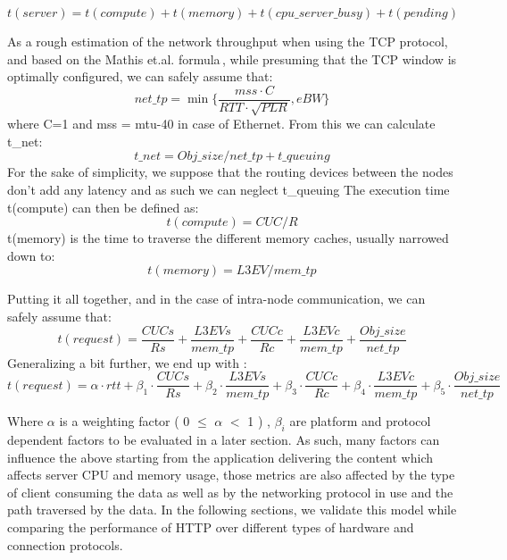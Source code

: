 \documentclass[runningheads]{llncs}
\begin{document}
\begin{equation}
t(server) = t(compute) + t(memory) + t(cpu\_server\_busy) + t(pending)
\end{equation}

As a rough estimation of the network throughput when using the TCP protocol, and based on the Mathis et.al. formula\,\cite{predictability}, while presuming that the TCP window is optimally configured, we can safely assume that:
\begin{equation}
net\_tp= \min\{\frac{mss\cdot C}{RTT \cdot \sqrt{PLR}}, eBW\}
\label{eq:net-tp}
\end{equation}
where C=1 and mss = mtu-40 in case of Ethernet.
From this we can calculate t\_net:
\begin{equation}
 t\_net=Obj\_size / net\_tp + t\_queuing
\end{equation}
For the sake of simplicity, we suppose that the routing devices between the nodes don’t add any latency and as such we can neglect t\_queuing
The execution time t(compute) can then be defined as:
\begin{equation}
t(compute) = CUC /R
\end{equation}
t(memory) is the time to traverse the different memory caches, usually narrowed down to:
\begin{equation}
t(memory)=L3EV/mem\_tp
\end{equation}

Putting it all together, and in the case of intra-node communication, we can safely assume that:
\begin{equation}
t(request)=\frac{CUCs}{Rs}+\frac{L3EVs}{mem\_tp}+\frac{CUCc}{Rc}+\frac{L3EVc}{mem\_tp}+\frac{Obj\_size}{net\_tp}
\end{equation}
Generalizing a bit further, we end up with :
\begin{equation}
\label{eq:model}
t(request)=\alpha\cdot rtt+\beta_1\cdot\frac{CUCs}{Rs}+\beta_2\cdot\frac{L3EVs}{mem\_tp}+\beta_3\cdot\frac{CUCc}{Rc}+\beta_4\cdot\frac{L3EVc}{mem\_tp}+\beta_5\cdot\frac{Obj\_size}{net\_tp}
\end{equation}

Where $\alpha$ is a weighting factor ( 0 $\leq$ $\alpha$ $<$ 1 ) \cite{rfc6298}, $\beta_i$ are platform and protocol dependent factors to be evaluated in a later section.
As such, many factors can influence the above starting from the application delivering the content which affects server CPU and memory usage, those metrics are also affected by the type of client consuming the data as well as by the networking protocol in use and the path traversed by the data. In the following sections, we validate this model while comparing the performance of HTTP over different types of hardware and connection protocols.
\end{document}
